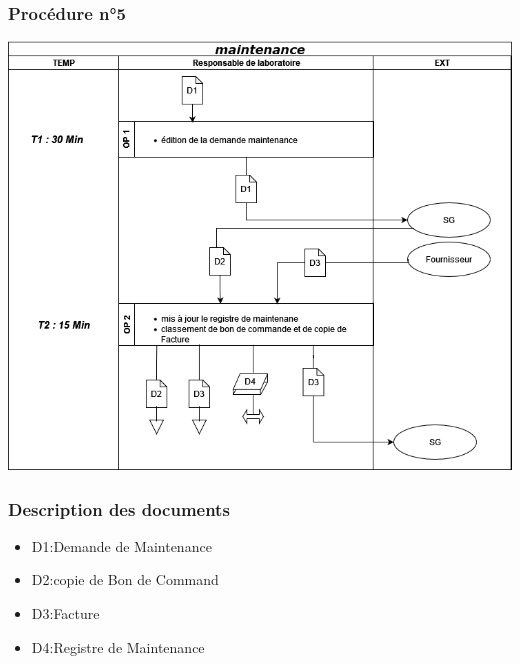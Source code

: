 \subsubsection*{Procédure n°5}
\includegraphics[width=1\textwidth]{chapter/Study of the Existing/EP/maintenance.png}
\subsubsection*{Description des documents}
\begin{itemize}
    \item D1:Demande de Maintenance
    \item D2:copie de Bon de Command
    \item D3:Facture
    \item D4:Registre de Maintenance
\end{itemize}

